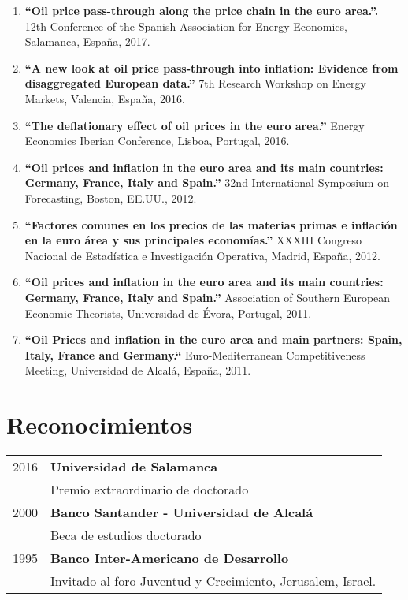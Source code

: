 \documentclass[11pt]{article}\usepackage[]{graphicx}\usepackage[]{color}
\begin{document}
\begin{enumerate}

\item \textbf{``Oil price pass-through along the price chain in the euro area.''.} 12th Conference of the Spanish Association for Energy Economics, Salamanca, España, 2017.

\item \textbf{``A new look at oil price pass-through into inflation: Evidence from disaggregated European data.''} 7th Research Workshop on Energy Markets, Valencia, España, 2016.

\item \textbf{``The deflationary effect of oil prices in the euro area.''} Energy Economics Iberian Conference, Lisboa, Portugal, 2016.

\item \textbf{``Oil prices and inflation in the euro area and its main countries: Germany, France, Italy and Spain.''} 32nd International Symposium on Forecasting, Boston, EE.UU., 2012.

\item \textbf{``Factores comunes en los precios de las materias primas e inflación en la euro área y sus principales economías.''} XXXIII Congreso Nacional de Estadística e Investigación Operativa, Madrid, España, 2012.

\item \textbf{``Oil prices and inflation in the euro area and its main countries: Germany, France, Italy and Spain.''} Association of Southern European Economic Theorists, Universidad de Évora, Portugal, 2011.

\item \textbf{``Oil Prices and inflation in the euro area and main partners: Spain, Italy, France and Germany.``} Euro-Mediterranean Competitiveness Meeting, Universidad de Alcalá, España, 2011.

\end{enumerate}

\section{Reconocimientos} 

\begin{tabular}{rl}

2016   & \textbf{Universidad de Salamanca}\\
& Premio extraordinario de doctorado\\

2000	 & \textbf{Banco Santander - Universidad de Alcalá}\\
&  Beca de estudios doctorado\\

1995 & \textbf{Banco Inter-Americano de Desarrollo}\\
& Invitado al foro Juventud y Crecimiento, Jerusalem, Israel.

\end{tabular}
\vspace{10pt}
\end{document}
